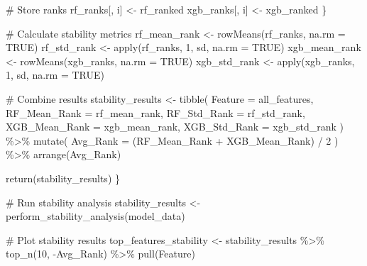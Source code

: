 \documentclass[
  letterpaper,
  DIV=11,
  numbers=noendperiod]{scrreprt}
\newenvironment{Shaded}{\begin{snugshade}}{\end{snugshade}}
\newcommand{\AttributeTok}[1]{\textcolor[rgb]{0.40,0.45,0.13}{#1}}
\newcommand{\CommentTok}[1]{\textcolor[rgb]{0.37,0.37,0.37}{#1}}
\newcommand{\ConstantTok}[1]{\textcolor[rgb]{0.56,0.35,0.01}{#1}}
\newcommand{\DecValTok}[1]{\textcolor[rgb]{0.68,0.00,0.00}{#1}}
\newcommand{\FunctionTok}[1]{\textcolor[rgb]{0.28,0.35,0.67}{#1}}
\newcommand{\NormalTok}[1]{\textcolor[rgb]{0.00,0.23,0.31}{#1}}
\newcommand{\OtherTok}[1]{\textcolor[rgb]{0.00,0.23,0.31}{#1}}
\newcommand{\SpecialCharTok}[1]{\textcolor[rgb]{0.37,0.37,0.37}{#1}}
\begin{document}
\begin{Shaded}
\begin{Highlighting}[]
    \CommentTok{\# Store ranks}
\NormalTok{    rf\_ranks[, i] }\OtherTok{\textless{}{-}}\NormalTok{ rf\_ranked}
\NormalTok{    xgb\_ranks[, i] }\OtherTok{\textless{}{-}}\NormalTok{ xgb\_ranked}
\NormalTok{  \}}
  
  \CommentTok{\# Calculate stability metrics}
\NormalTok{  rf\_mean\_rank }\OtherTok{\textless{}{-}} \FunctionTok{rowMeans}\NormalTok{(rf\_ranks, }\AttributeTok{na.rm =} \ConstantTok{TRUE}\NormalTok{)}
\NormalTok{  rf\_std\_rank }\OtherTok{\textless{}{-}} \FunctionTok{apply}\NormalTok{(rf\_ranks, }\DecValTok{1}\NormalTok{, sd, }\AttributeTok{na.rm =} \ConstantTok{TRUE}\NormalTok{)}
\NormalTok{  xgb\_mean\_rank }\OtherTok{\textless{}{-}} \FunctionTok{rowMeans}\NormalTok{(xgb\_ranks, }\AttributeTok{na.rm =} \ConstantTok{TRUE}\NormalTok{)}
\NormalTok{  xgb\_std\_rank }\OtherTok{\textless{}{-}} \FunctionTok{apply}\NormalTok{(xgb\_ranks, }\DecValTok{1}\NormalTok{, sd, }\AttributeTok{na.rm =} \ConstantTok{TRUE}\NormalTok{)}
  
  \CommentTok{\# Combine results}
\NormalTok{  stability\_results }\OtherTok{\textless{}{-}} \FunctionTok{tibble}\NormalTok{(}
    \AttributeTok{Feature =}\NormalTok{ all\_features,}
    \AttributeTok{RF\_Mean\_Rank =}\NormalTok{ rf\_mean\_rank,}
    \AttributeTok{RF\_Std\_Rank =}\NormalTok{ rf\_std\_rank,}
    \AttributeTok{XGB\_Mean\_Rank =}\NormalTok{ xgb\_mean\_rank,}
    \AttributeTok{XGB\_Std\_Rank =}\NormalTok{ xgb\_std\_rank}
\NormalTok{  ) }\SpecialCharTok{\%\textgreater{}\%}
    \FunctionTok{mutate}\NormalTok{(}
      \AttributeTok{Avg\_Rank =}\NormalTok{ (RF\_Mean\_Rank }\SpecialCharTok{+}\NormalTok{ XGB\_Mean\_Rank) }\SpecialCharTok{/} \DecValTok{2}
\NormalTok{    ) }\SpecialCharTok{\%\textgreater{}\%}
    \FunctionTok{arrange}\NormalTok{(Avg\_Rank)}
  
  \FunctionTok{return}\NormalTok{(stability\_results)}
\NormalTok{\}}

\CommentTok{\# Run stability analysis}
\NormalTok{stability\_results }\OtherTok{\textless{}{-}} \FunctionTok{perform\_stability\_analysis}\NormalTok{(model\_data)}

\CommentTok{\# Plot stability results}
\NormalTok{top\_features\_stability }\OtherTok{\textless{}{-}}\NormalTok{ stability\_results }\SpecialCharTok{\%\textgreater{}\%}
  \FunctionTok{top\_n}\NormalTok{(}\DecValTok{10}\NormalTok{, }\SpecialCharTok{{-}}\NormalTok{Avg\_Rank) }\SpecialCharTok{\%\textgreater{}\%}
  \FunctionTok{pull}\NormalTok{(Feature)}


\end{Highlighting}
\end{Shaded}
\end{document}
